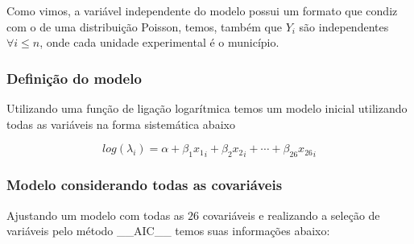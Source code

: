\documentclass[12pt,a4paper]{article}\usepackage[]{graphicx}\usepackage[]{color}
\begin{document}
Como vimos, a variável independente do modelo possui um formato que condiz com o de uma distribuição Poisson, temos, também que $Y_i$ são independentes $\forall i \leq n$, onde cada unidade experimental é o município.

\subsubsection{\textbf{Definição do modelo}}

Utilizando uma função de ligação logarítmica temos um modelo inicial utilizando todas as variáveis na forma sistemática abaixo

$$log(\lambda_i)=\alpha+\beta_1{x_1}_i+\beta_2{x_2}_i+\cdots+\beta_{26}{x_{26}}_i$$

\subsubsection{\textbf{Modelo considerando todas as covariáveis}}

Ajustando um modelo com todas as $26$ covariáveis e realizando a seleção de variáveis pelo método \_\_AIC\_\_ temos suas informações abaixo:
\end{document}
